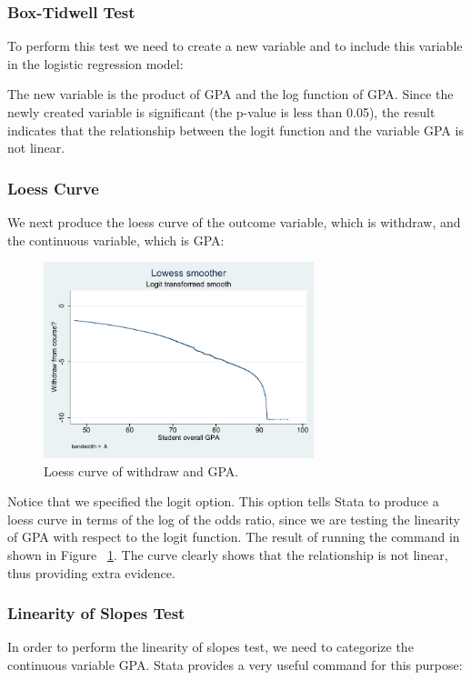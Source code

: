 \documentclass[a4paper,12pt,oneside]{book}
\begin{document}
\subsubsection{Box-Tidwell Test}
To perform this test we need to create a new variable and to include this variable in the logistic regression model:

\begin{stlog}\end{stlog}

The new variable is the product of GPA and the log function of GPA. Since the newly created variable is significant (the p-value is less than 0.05), the result indicates that the relationship between 
the logit function and the variable GPA is not linear.
\subsubsection{Loess Curve}
We next produce the loess curve of the outcome variable, which is withdraw, and the continuous variable, which is GPA:

\begin{stlog}\end{stlog}
\begin{figure}[h]
    \centering
    \includegraphics[width=0.7\textwidth]{book_10.pdf}
    \caption{Loess curve of withdraw and GPA.}
    \label{fig:lowesstest}
\end{figure}

Notice that we specified the logit option. This option tells Stata to produce a loess curve in terms of the log of the odds ratio, since we are testing the linearity of GPA with respect to the logit function. 
The result of running the command in shown in Figure ~\ref{fig:lowesstest}. The curve clearly shows that the relationship is not linear, thus providing extra evidence.
\subsubsection{Linearity of Slopes Test}
In order to perform the linearity of slopes test, we need to categorize the continuous variable GPA. Stata provides a very useful command for this purpose:
\end{document}
